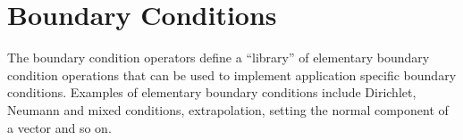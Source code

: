 \section{Boundary Conditions}

The boundary condition operators define a ``library'' of elementary boundary
condition operations that can be used to implement application specific
boundary conditions. Examples of elementary boundary conditions include
Dirichlet, Neumann and mixed conditions, extrapolation, setting the normal
component of a vector and so on. 





